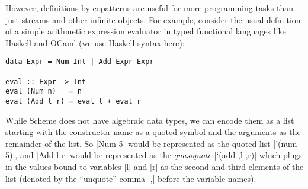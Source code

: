 


However, definitions by copatterns are useful for more programming tasks than just streams and other infinite objects.
For example, consider the usual definition of a simple arithmetic expression evaluator in typed functional languages like Haskell and OCaml (we use Haskell syntax here):
\begin{verbatim}
data Expr = Num Int | Add Expr Expr

eval :: Expr -> Int
eval (Num n)   = n
eval (Add l r) = eval l + eval r
\end{verbatim}
While Scheme does not have algebraic data types, we can encode them as a list starting with the constructor name as a quoted symbol and the arguments as the remainder of the list.
So \hs|Num 5| would be represented as the quoted list \scm|'(num 5)|, and \scm|Add l r| would be represented as the \emph{quasiquote} \scm|`(add ,l ,r)| which plugs in the values bound to variables \scm|l| and \scm|r| as the second and third elements of the list (denoted by the ``unquote'' comma \scm|,| before the variable names).
